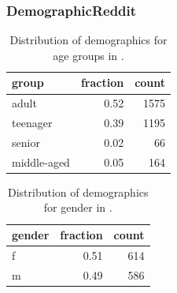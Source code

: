\subsubsection{DemographicReddit}

\begin{table}
    \centering
    \begin{tabular}{lrr}
    \toprule
    group & fraction & count \\
    \midrule
    adult & 0.52 & 1575 \\
    teenager & 0.39 & 1195 \\
    senior & 0.02 & 66 \\
    middle-aged & 0.05 & 164 \\
    \bottomrule
    \end{tabular}
    \caption{Distribution of demographics for age groups in \DSagefixed{}.}
    \label{tab:demographics:age_dist}
\end{table}

\begin{table}
    \centering
    \begin{tabular}{lrr}
    \toprule
    gender & fraction & count \\
    \midrule
    f & 0.51 & 614 \\
    m & 0.49 & 586 \\
    \bottomrule
    \end{tabular}
    \caption{Distribution of demographics for gender in \DSgenderfixed{}.}
    \label{tab:demographics:gender_dist}
\end{table}


